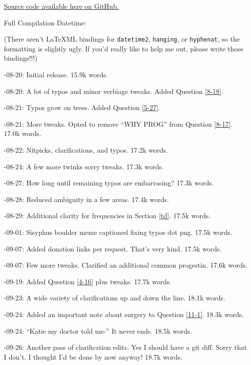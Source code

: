 \documentclass{article}
\begin{document}
{{\noindent \href{https://github.com/Juicysteak117/pghrt/}{Source code available here on GitHub.}

\noindent Full Compilation Datetime: \DTMnow

\noindent(There aren't LaTeXML bindings for \texttt{datetime2}, \texttt{hanging}, or \texttt{hyphenat}, so the formatting is slightly ugly. If you'd really like to help me out, please write those bindings!!!)

-08-20: Initial release. 15.9k words.

-08-20: A lot of typos and minor verbiage tweaks. Added Question \ref{8-18}.

-08-21: Typos grow on trees. Added Question \ref{5-27}.

-08-21: More tweaks. Opted to remove “WHY PROG” from Question \ref{8-17}. 17.0k words.

-08-22: Nitpicks, clarifications, and typos. 17.2k words.

-08-24: A few more twinks sorry tweaks. 17.3k words.

-08-27: How long until remaining typos are embarrasing? 17.3k words.

-08-28: Reduced ambiguity in a few areas. 17.4k words.

-08-29: Additional clarity for frequencies in Section \ref{td}. 17.5k words.

-09-01: Sisyphus boulder meme captioned fixing typos dot png. 17.5k words.

-09-07: Added donation links per request. That's very kind. 17.5k words.

-09-07: Few more tweaks. Clarified an additional common progestin. 17.6k words.

-09-19: Added Question \ref{4-16} plus tweaks. 17.7k words.

-09-23: A wide variety of clarifications up and down the line. 18.1k words.

-09-24: Added an important note about surgery to Question \ref{11-1}. 18.3k words.

-09-24: “Katie my doctor told me-” It never ends. 18.5k words.

-09-26: Another pass of clarification edits. Yes I should have a git diff. Sorry that I don't. I thought I'd be done by now anyway! 18.7k words.

}}
\end{document}
